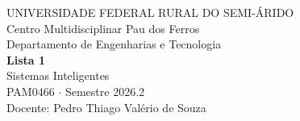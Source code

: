 \documentclass[11pt,a4paper]{article}
\begin{document}
\begin{center}
    {\small UNIVERSIDADE FEDERAL RURAL DO SEMI-ÁRIDO\\
        Centro Multidisciplinar Pau dos Ferros\\
        Departamento de Engenharias e Tecnologia}
    \vspace{0.8cm} \\
    {\bfseries{Lista 1}}\\[0.25cm]
    {\Large Sistemas Inteligentes}\\[0.3cm]
    {PAM0466 \quad $\cdot$ \quad Semestre 2026.2}\\[0.2cm]
    {\small Docente: Pedro Thiago Valério de Souza}
\end{center}
\vspace{0.6cm}
\newpage
\begingroup
\setlength{\parskip}{0pt}
\small
\tableofcontents
\endgroup
\newpage
\end{document}
